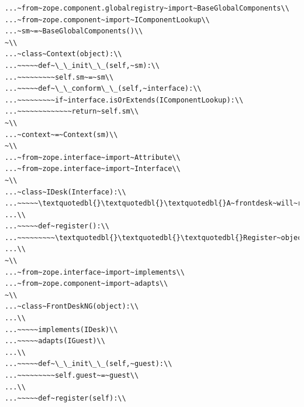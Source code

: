 \documentclass[a4paper,openany,twoside,draft]{book}
\begin{document}
\begin{verbatim}
...~from~zope.component.globalregistry~import~BaseGlobalComponents\\
...~from~zope.component~import~IComponentLookup\\
...~sm~=~BaseGlobalComponents()\\
~\\
...~class~Context(object):\\
...~~~~~def~\_\_init\_\_(self,~sm):\\
...~~~~~~~~~self.sm~=~sm\\
...~~~~~def~\_\_conform\_\_(self,~interface):\\
...~~~~~~~~~if~interface.isOrExtends(IComponentLookup):\\
...~~~~~~~~~~~~~return~self.sm\\
~\\
...~context~=~Context(sm)\\
~\\
...~from~zope.interface~import~Attribute\\
...~from~zope.interface~import~Interface\\
~\\
...~class~IDesk(Interface):\\
...~~~~~\textquotedbl{}\textquotedbl{}\textquotedbl{}A~frontdesk~will~register~object's~details\textquotedbl{}\textquotedbl{}\textquotedbl{}\\
...\\
...~~~~~def~register():\\
...~~~~~~~~~\textquotedbl{}\textquotedbl{}\textquotedbl{}Register~object's~details\textquotedbl{}\textquotedbl{}\textquotedbl{}\\
...\\
~\\
...~from~zope.interface~import~implements\\
...~from~zope.component~import~adapts\\
~\\
...~class~FrontDeskNG(object):\\
...\\
...~~~~~implements(IDesk)\\
...~~~~~adapts(IGuest)\\
...\\
...~~~~~def~\_\_init\_\_(self,~guest):\\
...~~~~~~~~~self.guest~=~guest\\
...\\
...~~~~~def~register(self):\\

\end{verbatim}
\end{document}
